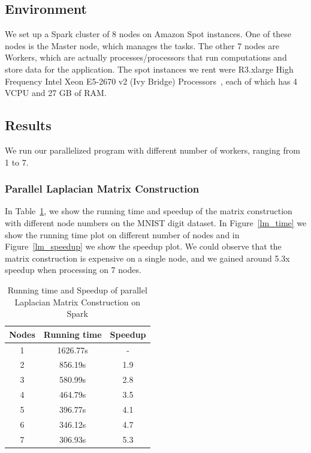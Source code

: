 \documentclass{acm_proc_article-sp}
\begin{document}
\subsection{Environment}
We set up a Spark cluster of 8 nodes on Amazon Spot instances. One of these nodes is the Master node, which manages the tasks. The other 7 nodes are Workers, which are actually processes/processors that run computations and store data for the application. The spot instances we rent were R3.xlarge High Frequency Intel Xeon E5-2670 v2 (Ivy Bridge) Processors~\cite{spotinstance}, each of which has 4 VCPU and 27 GB of RAM. 

\subsection{Results}
We run our parallelized program with different number of workers, ranging from 1 to 7.

\subsubsection{Parallel Laplacian Matrix Construction}
In Table~\ref{table_lap}, we show the running time and speedup of the matrix construction with different node numbers on the MNIST digit dataset. In Figure~\ref{lm_time} we show the running time plot on different number of nodes and in Figure~\ref{lm_speedup} we show the speedup plot. We could observe that the matrix construction is expensive on a single node, and we gained around 5.3x speedup when processing on 7 nodes.

\begin{table}[h]
\centering
\begin{tabular}{|c|c|c|}
\hline
Nodes & Running time & Speedup \\
\hline
 1 & 1626.77s & - \\
 2 & 856.19s & 1.9\\
 3 & 580.99s & 2.8 \\
 4 & 464.79s & 3.5\\
 5 & 396.77s & 4.1\\
 6 & 346.12s & 4.7\\
 7 & 306.93s & 5.3\\
 \hline
\end{tabular}
\caption{Running time and Speedup of parallel Laplacian Matrix Construction on Spark}
\label{table_lap}
\end{table}
\end{document}
